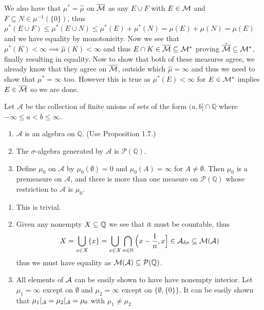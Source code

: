 \documentclass[12pt,a4paper]{article}
\begin{document}
\begin{solution}
\begin{enumerate}[label=\alph*.]
        We also have that $\mu^*=\hat{\mu}$ on $\overline{\mathcal{M}}$ as any $E\cup F$ with $E\in\mathcal{M}$ and $F\subseteq N\in\mu^{-1}(\{0\})$, thus $\mu^*(E\cup F)\leq\mu^*(E\cup N)\leq\mu^*(E)+\mu^*(N)=\mu(E)+\mu(N)=\mu(E)$ and we have equality by monotonicity.
        Now we see that $\mu^*(K)<\infty\implies\hat{\mu}(K)<\infty$ and thus $E\cap K\in\overline{\mathcal{M}}\subseteq\mathcal{M}^*$ proving $\tilde{\overline{\mathcal{M}}}\subseteq\mathcal{M}^*$, finally resulting in equality.
        Now to show that both of these measures agree, we already know that they agree on $\overline{\mathcal{M}}$, outside which $\hat{\mu}=\infty$ and thus we need to show that $\mu^*=\infty$ too.
        However this is true as $\mu^*(E)<\infty$ for $E\in\mathcal{M}^*$ implies $E\in\overline{\mathcal{M}}$ so we are done.
    \end{enumerate}
\end{solution}
\begin{problem}\label{prob:1-23}
Let $\mathcal{A}$ be the collection of finite unions of sets of the form $(a, b] \cap \mathbb{Q}$ where $-\infty \le a < b \le \infty$.
\begin{enumerate}[label=\alph*.]
    \item $\mathcal{A}$ is an algebra on $\mathbb{Q}$. (Use Proposition 1.7.)
    \item The $\sigma$-algebra generated by $\mathcal{A}$ is $\mathcal{P}(\mathbb{Q})$.
    \item Define $\mu_0$ on $\mathcal{A}$ by $\mu_0(\emptyset) = 0$ and $\mu_0(A) = \infty$ for $A \ne \emptyset$. Then $\mu_0$ is a premeasure on $\mathcal{A}$, and there is more than one measure on $\mathcal{P}(\mathbb{Q})$ whose restriction to $\mathcal{A}$ is $\mu_0$.
\end{enumerate}
\end{problem}
\begin{solution}
    \begin{enumerate}[label=\alph*.]
        \item This is trivial.
        \item Given any nonempty $X\subseteq\mathbb{Q}$ we see that it must be countable, thus 
        $$X=\bigcup_{x\in X}\{x\}=\bigcup_{x\in X}\bigcap_{n\in\mathbb{N}}\Big(x-\frac{1}{n},x\Big]\in\mathcal{A}_{\delta\sigma}\subseteq\mathcal{M}(\mathcal{A})$$ 
        thus we must have equality as $\mathcal{M}(\mathcal{A})\subseteq\mathcal P(\mathbb{Q})$. 
        \item All elements of $\mathcal{A}$ can be easily shown to have have nonempty interior.
        Let $\mu_1=\infty$ except on $\emptyset$ and $\mu_2=\infty$ except on $\{\emptyset,\{0\}\}$.
        It can be easily shown that $\mu_1|_{\mathcal{A}}=\mu_2|_{\mathcal{A}}=\mu_0$ with $\mu_1\neq\mu_2$
    \end{enumerate}
\end{solution}
\end{document}

